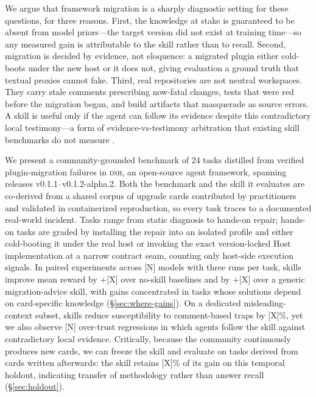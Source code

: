 \documentclass[11pt]{article}
\newcommand{\framework}{\textsc{dsh}}
\begin{document}
We argue that framework migration is a sharply diagnostic setting for these questions, for three reasons.
First, the knowledge at stake is guaranteed to be absent from model priors---the target version did not exist at training time---so any measured gain is attributable to the skill rather than to recall.
Second, migration is decided by evidence, not eloquence: a migrated plugin either cold-boots under the new host or it does not, giving evaluation a ground truth that textual proxies cannot fake.
Third, real repositories are not neutral workspaces.
They carry stale comments prescribing now-fatal changes, tests that were red before the migration began, and build artifacts that masquerade as source errors.
A skill is useful only if the agent can follow its evidence despite this contradictory local testimony---a form of evidence-vs-testimony arbitration that existing skill benchmarks do not measure \citep{adversarialcomments,knowledgeclashes}.

We present a community-grounded benchmark of 24 tasks distilled from verified plugin-migration failures in \framework{}, an open-source agent framework, spanning releases v0.1.1--v0.1.2-alpha.2.
Both the benchmark and the skill it evaluates are co-derived from a shared corpus of upgrade cards contributed by practitioners and validated in containerized reproduction, so every task traces to a documented real-world incident.
Tasks range from static diagnosis to hands-on repair; hands-on tasks are graded by installing the repair into an isolated profile and either cold-booting it under the real host or invoking the exact version-locked Host implementation at a narrow contract seam, counting only host-side execution signals.
In paired experiments across [N] models with three runs per task, skills improve mean reward by +[X] over no-skill baselines and by +[X] over a generic migration-advice skill, with gains concentrated in tasks whose solutions depend on card-specific knowledge (\S\ref{sec:where-gains}).
On a dedicated misleading-context subset, skills reduce susceptibility to comment-based traps by [X]\%, yet we also observe [N] over-trust regressions in which agents follow the skill against contradictory local evidence.
Critically, because the community continuously produces new cards, we can freeze the skill and evaluate on tasks derived from cards written afterwards: the skill retains [X]\% of its gain on this temporal holdout, indicating transfer of methodology rather than answer recall (\S\ref{sec:holdout}).
\end{document}
